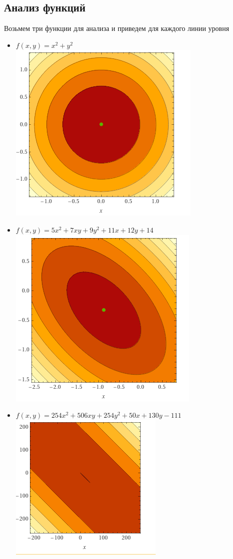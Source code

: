 \documentclass[a4paper, 14pt]{article}
\begin{document}
		\subsection*{Анализ функций}
		Возьмем три функции для анализа и приведем для каждого линии уровня
		\begin{itemize}
			\item $f(x, y) = x^2 + y^2$ \\
			\includegraphics{img/1.png}
			\item $f(x, y) = 5x^2 + 7xy + 9y^2 + 11x + 12y + 14$ \\
			\includegraphics{img/2.png}
			\item $f(x, y) = 254x^2 + 506xy + 254y^2 + 50x + 130y - 111$ \\
			\includegraphics{img/3.png}
		\end{itemize}
		
\end{document}
